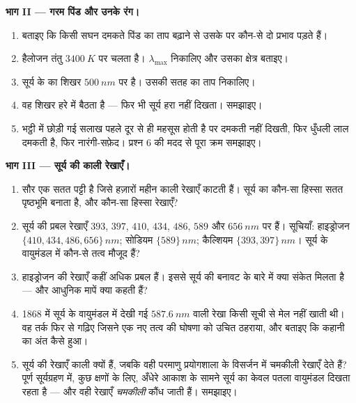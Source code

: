 \begin{problem}
\medskip
\noindent\textbf{भाग II --- गरम पिंड और उनके रंग।}
\begin{enumerate}[resume]
  \item बताइए कि किसी सघन दमकते पिंड का ताप बढ़ाने से उसके
         पर कौन-से दो प्रभाव पड़ते हैं।
  \item हैलोजन तंतु $\qty{3400}{K}$ पर चलता है। $\lambda_{\max}$ निकालिए और उसका क्षेत्र
        बताइए।
  \item सूर्य के  का शिखर $\qty{500}{nm}$ पर है। उसकी सतह
        का ताप निकालिए।
  \item वह शिखर हरे में बैठता है --- फिर भी सूर्य हरा नहीं दिखता।
        समझाइए।
  \item भट्ठी में छोड़ी गई सलाख पहले दूर से ही महसूस होती है पर दमकती
        नहीं दिखती, फिर धुँधली लाल दमकती है, फिर नारंगी-सफ़ेद। प्रश्न 6
        की मदद से पूरा क्रम समझाइए।
\end{enumerate}

\medskip
\noindent\textbf{भाग III --- सूर्य की काली रेखाएँ।}
\begin{enumerate}[resume]
  \item सौर  एक सतत पट्टी है जिसे हज़ारों महीन काली
        रेखाएँ काटती हैं। सूर्य का कौन-सा हिस्सा सतत पृष्ठभूमि बनाता
        है, और कौन-सा हिस्सा रेखाएँ?
  \item सूर्य की प्रबल रेखाएँ $393$, $397$, $410$, $434$,
        $486$, $589$ और $\qty{656}{nm}$ पर हैं। सूचियाँ: हाइड्रोजन
        $\{410, 434, 486, 656\}\,\unit{nm}$; सोडियम $\{589\}\,\unit{nm}$; कैल्शियम $\{393, 397\}\,\unit{nm}$। सूर्य के वायुमंडल
        में कौन-से तत्व मौजूद हैं?
  \item हाइड्रोजन की रेखाएँ कहीं अधिक प्रबल हैं। इससे सूर्य की बनावट
        के बारे में क्या संकेत मिलता है --- और आधुनिक मापें क्या कहती
        हैं?
  \item 1868 में सूर्य के वायुमंडल में देखी गई $\qty{587.6}{nm}$ वाली रेखा किसी
        सूची से मेल नहीं खाती थी। वह तर्क फिर से गढ़िए जिसने एक नए तत्व
        की घोषणा को उचित ठहराया, और बताइए कि कहानी का अंत कैसे हुआ।
  \item सूर्य की रेखाएँ काली क्यों हैं, जबकि वही परमाणु प्रयोगशाला के
        विसर्जन में चमकीली रेखाएँ देते हैं? पूर्ण सूर्यग्रहण में, कुछ
        क्षणों के लिए, अँधेरे आकाश के सामने सूर्य का केवल पतला
        वायुमंडल दिखता रहता है --- और वही रेखाएँ \emph{चमकीली} कौंध
        जाती हैं। समझाइए।
\end{enumerate}


\end{problem}

